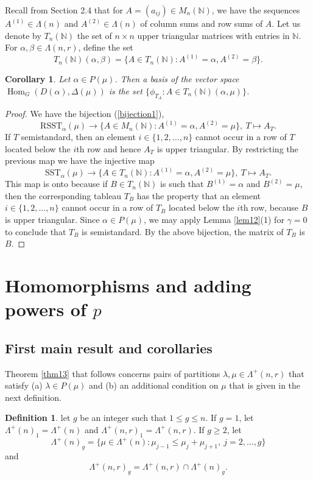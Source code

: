 \documentclass[11pt]{article}
\newtheorem{coro}[theo]{Corollary}
\theoremstyle{definition}
\newtheorem{defi}[theo]{Definition}
\numberwithin{equation}{section}
\newcommand{\al}{\alpha}
\newcommand{\La}{\Lambda}
\DeclareMathOperator{\Hom}{Hom}
\numberwithin{equation}{section}
\begin{document}
	Recall from Section 2.4 that for $A=(a_{ij}) \in M_{n}(\mathbb{N})$, we have the sequences $A^{(1)}\in \La(n)$ and $A^{(2)}\in \La(n)$ of column sums and row sums of $A$. Let us denote by $T_{n}(\mathbb{N})$ the set of $n \times n$ upper triangular matrices with entries in $\mathbb{N}$. For $\al, \beta  \in \La(n,r)$, define the set \[T_{n}(\mathbb{N})(\al, \beta) = \{A \in T_{n}(\mathbb{N}): A^{(1)}=\al, A^{(2)}=\beta\}.\]
	\begin{coro}\label{triang}
		Let $\al \in P(\mu)$. Then a basis of the vector space $\Hom_G(D(\al),\Delta(\mu))$ is the set $\{\phi_{T_A}: A \in T_{n}(\mathbb{N})(\al, \mu)\}$.
	\end{coro}
\begin{proof} We have the bijection (\ref{bijection1}), \[\mathrm{RSST}_{\al}(\mu) \to \{A \in M_{n}(\mathbb{N}): A^{(1)}=\al, A^{(2)}=\mu\}, \ T \mapsto A_T.\] If $T$ semistandard, then an element $i \in \{1,2,\dots,n\}$ cannot occur in a row of $T$ located below the $i$th row and hence $ A_T$ is upper triangular. By restricting the previous map we have the injective map \[\mathrm{SST}_{\al}(\mu) \to \{A \in T_{n}(\mathbb{N}): A^{(1)}=\al, A^{(2)}=\mu\}, \ T \mapsto A_T.\]
	This map is onto because if $B \in T_{n}(\mathbb{N})$ is such that $B^{(1)}=\al$ and $ B^{(2)}=\mu$, then the corresponding tableau $T_B$ has the property that an element $i \in \{1,2,\dots,n\}$ cannot occur in a row of $T_B$ located below the $i$th row, because $B$ is upper triangular. Since $\al \in P(\mu)$, we may apply  Lemma \ref{lem12}(1) for $\gamma =0$ to conclude that $T_B$ is semistandard. By the above bijection, the matrix of $T_B$ is $B$.
	\end{proof}

	\section{Homomorphisms and adding powers of \texorpdfstring{$p$}{p}}
	\subsection{First main result and corollaries} Theorem \ref{thm13} that follows concerns pairs of partitions $\lambda, \mu \in \La^+(n,r)$ that satisfy (a) $\lambda \in P(\mu)$ and (b) an additional condition on $\mu$ that is given in the next definition.
	\begin{defi}\label{def}
		let $g$ be an integer such that $1 \le g \le n$. If $g=1$, let $\La^{+}(n)_1=\La^{+}(n)$ and $\La^{+}(n,r)_1=\La^{+}(n,r)$. If $g \ge 2$, let \[ \La^{+}(n)_g=\{\mu \in \La^{+}(n): \mu_{j-1} \le \mu_j +\mu_{j+1}, \ j=2,\dots,g\} \] and \[\La^{+}(n,r)_g= \La^{+}(n,r) \cap \La^{+}(n)_g.\]
	\end{defi}
	
\end{document}
